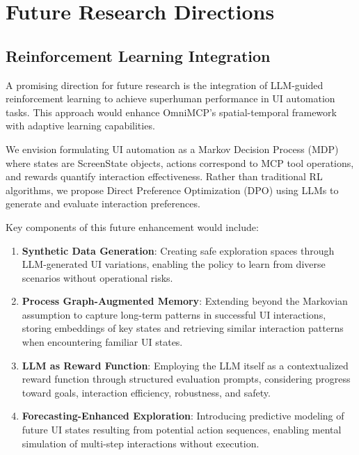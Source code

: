 \documentclass{article}
\begin{document}
\section{Future Research Directions}

\subsection{Reinforcement Learning Integration}

A promising direction for future research is the integration of LLM-guided reinforcement learning to achieve superhuman performance in UI automation tasks. This approach would enhance OmniMCP's spatial-temporal framework with adaptive learning capabilities.

We envision formulating UI automation as a Markov Decision Process (MDP) where states are ScreenState objects, actions correspond to MCP tool operations, and rewards quantify interaction effectiveness. Rather than traditional RL algorithms, we propose Direct Preference Optimization (DPO) using LLMs to generate and evaluate interaction preferences.

Key components of this future enhancement would include:

\begin{enumerate}
    \item \textbf{Synthetic Data Generation}: Creating safe exploration spaces through LLM-generated UI variations, enabling the policy to learn from diverse scenarios without operational risks.
    
    \item \textbf{Process Graph-Augmented Memory}: Extending beyond the Markovian assumption to capture long-term patterns in successful UI interactions, storing embeddings of key states and retrieving similar interaction patterns when encountering familiar UI states.
    
    \item \textbf{LLM as Reward Function}: Employing the LLM itself as a contextualized reward function through structured evaluation prompts, considering progress toward goals, interaction efficiency, robustness, and safety.
    
    \item \textbf{Forecasting-Enhanced Exploration}: Introducing predictive modeling of future UI states resulting from potential action sequences, enabling mental simulation of multi-step interactions without execution.
\end{enumerate}
\end{document}
